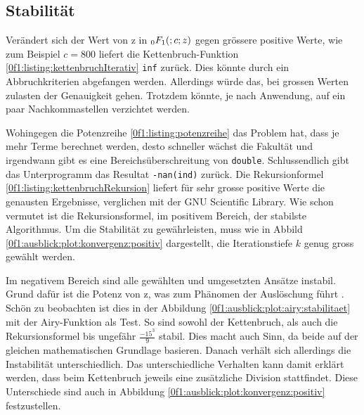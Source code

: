 \subsection{Stabilität
\label{0f1:subsection:Stabilitaet}}
Verändert sich der Wert von z in $\mathstrut_0F_1(;c;z)$ gegen grössere positive Werte, wie zum Beispiel $c = 800$ liefert die Kettenbruch-Funktion \ref{0f1:listing:kettenbruchIterativ} \verb+inf+ zurück. Dies könnte durch ein Abbruchkriterien abgefangen werden. Allerdings würde das, bei grossen Werten zulasten der Genauigkeit gehen. Trotzdem könnte, je nach Anwendung, auf ein paar Nachkommastellen verzichtet werden.

Wohingegen die Potenzreihe \eqref{0f1:listing:potenzreihe} das Problem hat, dass je mehr Terme berechnet werden, desto schneller wächst die Fakultät und irgendwann gibt es eine Bereichsüberschreitung von \verb+double+. Schlussendlich gibt das Unterprogramm das Resultat \verb+-nan(ind)+ zurück.
Die Rekursionformel \eqref{0f1:listing:kettenbruchRekursion} liefert für sehr grosse positive Werte die genausten Ergebnisse, verglichen mit der GNU Scientific Library. Wie schon vermutet ist die Rekursionsformel, im positivem Bereich, der stabilste Algorithmus. Um die Stabilität zu gewährleisten, muss wie in Abbild \ref{0f1:ausblick:plot:konvergenz:positiv} dargestellt, die Iterationstiefe $k$ genug gross gewählt werden.

Im negativem Bereich sind alle gewählten und umgesetzten Ansätze instabil. Grund dafür ist die Potenz von z, was zum Phänomen der Auslöschung führt \cite{0f1:SeminarNumerik}. Schön zu beobachten ist dies in der Abbildung \ref{0f1:ausblick:plot:airy:stabilitaet} mit der Airy-Funktion als Test. So sind sowohl der Kettenbruch, als auch die Rekursionsformel bis ungefähr $\frac{-15^3}{9}$ stabil. Dies macht auch Sinn, da beide auf der gleichen mathematischen Grundlage basieren. Danach verhält sich allerdings die Instabilität unterschiedlich. Das unterschiedliche Verhalten kann damit erklärt werden, dass beim Kettenbruch jeweils eine zusätzliche Division stattfindet. Diese Unterschiede sind auch in Abbildung \ref{0f1:ausblick:plot:konvergenz:positiv} festzustellen.



